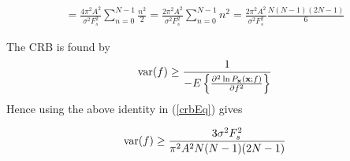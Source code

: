 \begin{align}
	\label{crbEq} = \frac{{4{\pi ^2}{A^2}}}{{{\sigma
				^2}F_s^2}}\sum\limits_{n = 0}^{N - 1} {\frac{{{n^2}}}{2}}  =
	\frac{{2{\pi ^2}{A^2}}}{{{\sigma ^2}F_s^2}}\sum\limits_{n = 0}^{N
		- 1} {{n^2}}  = \frac{{2{\pi ^2}{A^2}}}{{{\sigma
				^2}F_s^2}}\frac{{N(N - 1)(2N - 1)}}{6}
\end{align}

The CRB is found by
\[{\mathop{\rm var}} (f) \ge \frac{1}{{ - E\left\{ {\frac{{{\partial ^2}\ln {P_{\mathbf{x}}}({\mathbf{x}};f)}}{{\partial {f^2}}}} \right\}}}\]
Hence using the above identity in (\ref{crbEq}) gives

\begin{align}
	{\mathop{\rm var}} (f) \ge \frac{{3{\sigma ^2}F_s^2}}{{{\pi
				^2}{A^2}N(N - 1)(2N - 1)}}
\end{align}
